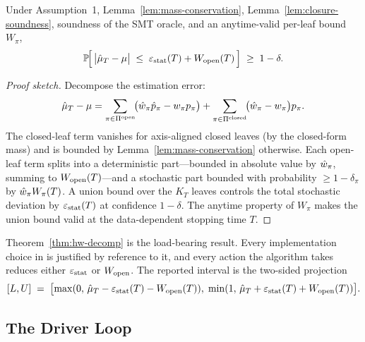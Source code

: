\begin{theorem}%
  \label{thm:hw-decomp}
  Under Assumption~1, Lemma~\ref{lem:mass-conservation},
  Lemma~\ref{lem:closure-soundness}, soundness of the SMT oracle, and
  an anytime-valid per-leaf bound $W_\pi$,
  \begin{equation}
    \mathbb{P}\!\Big[\,\big|\hat{\mu}_T - \mu\big|
      \;\le\; \varepsilon_{\mathrm{stat}}(T) + W_{\mathrm{open}}(T)\,\Big]
    \;\ge\; 1 - \delta.
  \end{equation}
\end{theorem}

\begin{proof}[Proof sketch]
  Decompose the estimation error:
  \[
    \hat{\mu}_T - \mu
    = \sum_{\pi \in \Pi^{\mathrm{open}}}
        \!\bigl(\hat{w}_\pi\hat{p}_\pi - w_\pi p_\pi\bigr)
      + \sum_{\pi \in \Pi^{\mathrm{closed}}}
        \!\bigl(\hat{w}_\pi - w_\pi\bigr)p_\pi.
  \]
  The closed-leaf term vanishes for axis-aligned closed leaves
  (by the closed-form mass) and is bounded by
  Lemma~\ref{lem:mass-conservation} otherwise.  Each open-leaf term
  splits into a deterministic part---bounded in absolute value by
  $\hat{w}_\pi$, summing to $W_{\mathrm{open}}(T)$---and a stochastic part
  bounded with probability $\ge 1-\delta_\pi$ by
  $\hat{w}_\pi W_\pi(T)$.  A union bound over the $K_T$ leaves
  controls the total stochastic deviation by $\varepsilon_{\mathrm{stat}}(T)$ at
  confidence $1-\delta$.  The anytime property of $W_\pi$ makes
  the union bound valid at the data-dependent stopping time $T$.
\end{proof}

Theorem~\ref{thm:hw-decomp} is the load-bearing result.  Every
implementation choice in  is justified by
reference to it, and every action the algorithm takes reduces either
$\varepsilon_{\mathrm{stat}}$ or $W_{\mathrm{open}}$.  The reported interval is the two-sided
projection
\begin{equation}\label{eq:interval}
  [L, U] \;=\;
  \bigl[\max(0,\,\hat{\mu}_T - \varepsilon_{\mathrm{stat}}(T) - W_{\mathrm{open}}(T)),\;
        \min(1,\,\hat{\mu}_T + \varepsilon_{\mathrm{stat}}(T) + W_{\mathrm{open}}(T))\bigr].
\end{equation}

\subsection{The Driver Loop}\label{sec:asip-loop}

